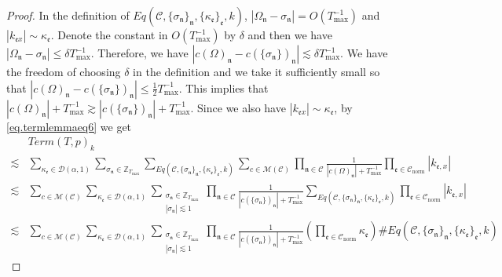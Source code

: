\begin{proof}
In the definition of $Eq(\mathcal{C}, \{\sigma_{\mathfrak{n}}\}_{\mathfrak{n}}, \{\kappa_{\mathfrak{e}}\}_{\mathfrak{e}},k)$,
$|\Omega_{\mathfrak{n}}-\sigma_{\mathfrak{n}}|=O(T^{-1}_{\text{max}})$ and $|k_{\mathfrak{e}x}| \sim \kappa_{\mathfrak{e}}$. Denote the constant in $O(T^{-1}_{\text{max}})$ by $\delta$ and then we have $|\Omega_{\mathfrak{n}}-\sigma_{\mathfrak{n}}|\le \delta T^{-1}_{\text{max}}$. Therefore, we have $|c(\Omega)_{\mathfrak{n}}-c(\{\sigma_{\mathfrak{n}}\})_{\mathfrak{n}}|\lesssim \delta T^{-1}_{\text{max}}$. We have the freedom of choosing $\delta$ in the definition and we take it sufficiently small so that $|c(\Omega)_{\mathfrak{n}}-c(\{\sigma_{\mathfrak{n}}\})_{\mathfrak{n}}|\le \frac{1}{2}T^{-1}_{\text{max}}$. This implies that $|c(\Omega)_{\mathfrak{n}}|+T^{-1}_{\text{max}}\gtrsim |c(\{\sigma_{\mathfrak{n}}\})_{\mathfrak{n}}|+T^{-1}_{\text{max}}$. Since we also have $|k_{\mathfrak{e}x}| \sim \kappa_{\mathfrak{e}}$, by \eqref{eq.termlemmaeq6} we get
\begin{equation}\label{eq.lemboundtermTp}
\begin{split}
    &Term(T, p)_k
    \\
    \lesssim& \sum_{\kappa_{\mathfrak{e}}\in \mathcal{D}(\alpha,1)}\sum_{\sigma_{\mathfrak{n}}\in \mathbb{Z}_{T_{\text{max}}}}\sum_{Eq(\mathcal{C}, \{\sigma_{\mathfrak{n}}\}_{\mathfrak{n}}, \{\kappa_{\mathfrak{e}}\}_{\mathfrak{e}},k)} \sum_{c\in \mathscr{M}(\mathcal{C}) }\prod_{\mathfrak{n}\in \mathcal{C}}\frac{1}{|c(\Omega)_{\mathfrak{n}}|+T^{-1}_{\text{max}}} \prod_{\mathfrak{e}\in \mathcal{C}_{\text{norm}}}|k_{\mathfrak{e},x}|
    \\
    \lesssim &\sum_{c\in \mathscr{M}(\mathcal{C}) }\sum_{\kappa_{\mathfrak{e}}\in \mathcal{D}(\alpha,1)}\sum_{\substack{\sigma_{\mathfrak{n}}\in \mathbb{Z}_{T_{\text{max}}}\\ |\sigma_{\mathfrak{n}}|\lesssim 1}}\prod_{\mathfrak{n}\in \mathcal{C}}\frac{1}{|c(\{\sigma_{\mathfrak{n}}\})_{\mathfrak{n}}|+T^{-1}_{\text{max}}} \sum_{Eq(\mathcal{C}, \{\sigma_{\mathfrak{n}}\}_{\mathfrak{n}}, \{\kappa_{\mathfrak{e}}\}_{\mathfrak{e}},k)} \prod_{\mathfrak{e}\in \mathcal{C}_{\text{norm}}}|k_{\mathfrak{e},x}|
    \\
    \lesssim &\sum_{c\in \mathscr{M}(\mathcal{C}) }\sum_{\kappa_{\mathfrak{e}}\in \mathcal{D}(\alpha,1)}\sum_{\substack{\sigma_{\mathfrak{n}}\in \mathbb{Z}_{T_{\text{max}}}\\ |\sigma_{\mathfrak{n}}|\lesssim 1}}\prod_{\mathfrak{n}\in \mathcal{C}}\frac{1}{|c(\{\sigma_{\mathfrak{n}}\})_{\mathfrak{n}}|+T^{-1}_{\text{max}}} \left(\prod_{\mathfrak{e}\in \mathcal{C}_{\text{norm}}}\kappa_{\mathfrak{e}}\right)\#Eq(\mathcal{C}, \{\sigma_{\mathfrak{n}}\}_{\mathfrak{n}}, \{\kappa_{\mathfrak{e}}\}_{\mathfrak{e}},k) 

\end{split}
\end{equation}
\end{proof}
